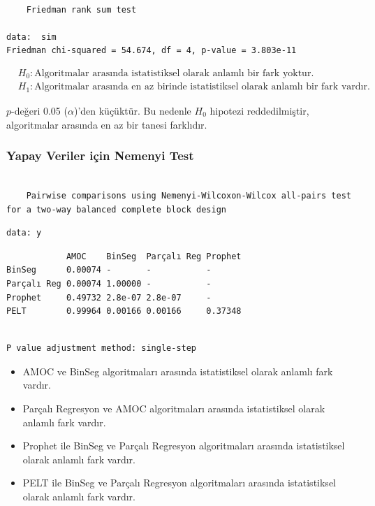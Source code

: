 \documentclass[12pt,twoside]{deuthesis}
\begin{document}
\begin{verbatim}

    Friedman rank sum test

data:  sim
Friedman chi-squared = 54.674, df = 4, p-value = 3.803e-11
\end{verbatim}

\begin{align*}
& H_0: \text{Algoritmalar arasında istatistiksel olarak anlamlı bir fark yoktur.} \\
& H_1: \text{Algoritmalar arasında en az birinde istatistiksel olarak anlamlı bir fark vardır.}
\end{align*}

\(p\)-değeri 0.05 (\(\alpha\))'den küçüktür. Bu nedenle \(H_0\) hipotezi reddedilmiştir, algoritmalar arasında en az bir tanesi farklıdır.

\hypertarget{yapay-veriler-iuxe7in-nemenyi-test}{%
\subsubsection{Yapay Veriler için Nemenyi Test}\label{yapay-veriler-iuxe7in-nemenyi-test}}

\begin{verbatim}

    Pairwise comparisons using Nemenyi-Wilcoxon-Wilcox all-pairs test for a two-way balanced complete block design
\end{verbatim}

\begin{verbatim}
data: y
\end{verbatim}

\begin{verbatim}
            AMOC    BinSeg  Parçalı Reg Prophet
BinSeg      0.00074 -       -           -      
Parçalı Reg 0.00074 1.00000 -           -      
Prophet     0.49732 2.8e-07 2.8e-07     -      
PELT        0.99964 0.00166 0.00166     0.37348
\end{verbatim}

\begin{verbatim}

P value adjustment method: single-step
\end{verbatim}

\begin{itemize}
    \item AMOC ve BinSeg algoritmaları arasında istatistiksel olarak anlamlı fark vardır.
    \item Parçalı Regresyon ve AMOC algoritmaları arasında istatistiksel olarak anlamlı fark vardır.
    \item Prophet ile BinSeg ve Parçalı Regresyon algoritmaları arasında istatistiksel olarak anlamlı fark vardır.
    \item PELT ile BinSeg ve Parçalı Regresyon algoritmaları arasında istatistiksel olarak anlamlı fark vardır.
\end{itemize}
\end{document}
